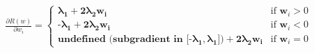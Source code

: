 \documentclass[preview]{standalone}
\begin{document}
\begin{align*}
\frac{\partial R(w)}{\partial w_i} =\begin{cases}\boldsymbol{\lambda}_\textbf{1} + \textbf{2}\boldsymbol{\lambda}_\textbf{2} \mathbf{w_i} & \text{if } \mathbf{w}_i > 0 \\\textbf{-}\boldsymbol{\lambda}_\textbf{1} + \textbf{2}\boldsymbol{\lambda}_\textbf{2} \mathbf{w_i} & \text{if } \mathbf{w}_i < 0 \\\textbf{undefined (subgradient in } \textbf{[}\textbf{-}\boldsymbol{\lambda}_\textbf{1}, \boldsymbol{\lambda}_\textbf{1}\textbf{]}\textbf{)} + \textbf{2}\mathbf{\lambda}_\textbf{2}\mathbf{w}_\textbf{i} & \text{if } \mathbf{w}_i = 0\end{cases}
\end{align*}
\end{document}
